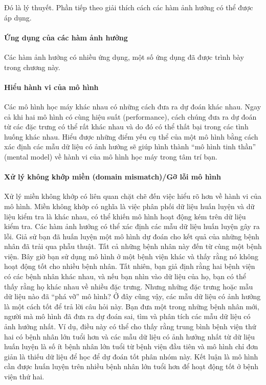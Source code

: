 Đó là lý thuyết. Phần tiếp theo giải thích cách các hàm ảnh hưởng có thể được áp dụng.

\paragraph{Ứng dụng của các hàm ảnh hưởng}

Các hàm ảnh hưởng có nhiều ứng dụng, một số ứng dụng đã được trình bày trong chương này.

\paragraph{Hiểu hành vi của mô hình}

Các mô hình học máy khác nhau có những cách đưa ra dự đoán khác nhau. Ngay cả khi hai mô hình có cùng hiệu suất (performance), cách chúng đưa ra dự đoán từ các đặc trưng có thể rất khác nhau và do đó có thể thất bại trong các tình huống khác nhau. Hiểu được những điểm yếu cụ thể của một mô hình bằng cách xác định các mẫu dữ liệu có ảnh hưởng sẽ giúp hình thành ``mô hình tinh thần'' (mental model) về hành vi của mô hình học máy trong tâm trí bạn.

\paragraph{Xử lý không khớp miền (domain mismatch)/Gỡ lỗi mô hình}

Xử lý miền không khớp có liên quan chặt chẽ đến việc hiểu rõ hơn về hành vi của mô hình. Miền không khớp có nghĩa là việc phân phối dữ liệu huấn luyện và dữ liệu kiểm tra là khác nhau, có thể khiến mô hình hoạt động kém trên dữ liệu kiểm tra. Các hàm ảnh hưởng có thể xác định các mẫu dữ liệu huấn luyện gây ra lỗi. Giả sử bạn đã huấn luyện một mô hình dự đoán cho kết quả của những bệnh nhân đã trải qua phẫu thuật. Tất cả những bệnh nhân này đến từ cùng một bệnh viện. Bây giờ bạn sử dụng mô hình ở một bệnh viện khác và thấy rằng nó không hoạt động tốt cho nhiều bệnh nhân. Tất nhiên, bạn giả định rằng hai bệnh viện có các bệnh nhân khác nhau, và nếu bạn nhìn vào dữ liệu của họ, bạn có thể thấy rằng họ khác nhau về nhiều đặc trưng. Nhưng những đặc trưng hoặc mẫu dữ liệu nào đã ``phá vỡ'' mô hình? Ở đây cũng vậy, các mẫu dữ liệu có ảnh hưởng là một cách tốt để trả lời câu hỏi này. Bạn đưa một trong những bệnh nhân mới, người mà mô hình đã đưa ra dự đoán sai, tìm và phân tích các mẫu dữ liệu có ảnh hưởng nhất. Ví dụ, điều này có thể cho thấy rằng trung bình bệnh viện thứ hai có bệnh nhân lớn tuổi hơn và các mẫu dữ liệu có ảnh hưởng nhất từ dữ liệu huấn luyện là số ít bệnh nhân lớn tuổi từ bệnh viện đầu tiên và mô hình chỉ đơn giản là thiếu dữ liệu để học để dự đoán tốt phân nhóm này. Kết luận là mô hình cần được huấn luyện trên nhiều bệnh nhân lớn tuổi hơn để hoạt động tốt ở bệnh viện thứ hai.

